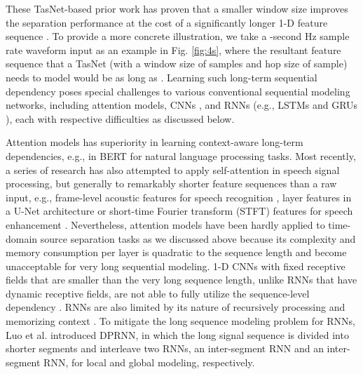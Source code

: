 \documentclass{article}
\begin{document}
These TasNet-based prior work has proven that a smaller window size improves the separation performance at the cost of a significantly longer 1-D feature sequence \cite{luo2019dual,chen2020dual}. To provide a more concrete illustration, we take a -second Hz sample rate waveform input as an example in Fig. \ref{fig:4s}, where the resultant feature sequence that a TasNet (with a window size of  samples and hop size of  sample) needs to model would be as long as . Learning such long-term sequential dependency poses special challenges to various conventional sequential modeling networks, including attention models\cite{giri2019attention,kim2019transformer}, CNNs \cite{daniel2018unet,luo2019conv}, and RNNs (e.g., LSTMs\cite{gers1999learning} and GRUs \cite{chung2014empirical}), each with respective difficulties as discussed below.

Attention models \cite{vaswani2017attention} has superiority in learning context-aware long-term dependencies, e.g., in BERT \cite{devlin2018bert} for natural language processing tasks. Most recently, a series of research has also attempted to apply self-attention in speech signal processing, but generally to remarkably shorter feature sequences than a raw input, e.g., frame-level acoustic features for speech recognition \cite{dong2018speech, pham2019very, han2019multi, luo2020simplified}, layer features in a U-Net architecture \cite{giri2019attention} or short-time Fourier transform (STFT) features for speech enhancement \cite{kim2019transformer}. Nevertheless, attention models have been hardly applied to time-domain source separation tasks as we discussed above because its complexity and memory consumption per layer is quadratic to the sequence length and become unacceptable for very long sequential modeling.
1-D CNNs with fixed receptive fields that are smaller than the very long sequence length, unlike RNNs that have dynamic receptive fields, are not able to fully utilize the sequence-level dependency \cite{bai2018empirical}.
RNNs are also limited by its nature of recursively processing and memorizing context \cite{khandelwal2018sharp,ravanelli2018light,wang2019r}. To mitigate the long sequence modeling problem for RNNs, Luo et al. \cite{luo2019dual} introduced DPRNN, in which the long signal sequence is divided into shorter segments and interleave two RNNs, an inter-segment RNN and an inter-segment RNN, for local and global modeling, respectively.
\end{document}
